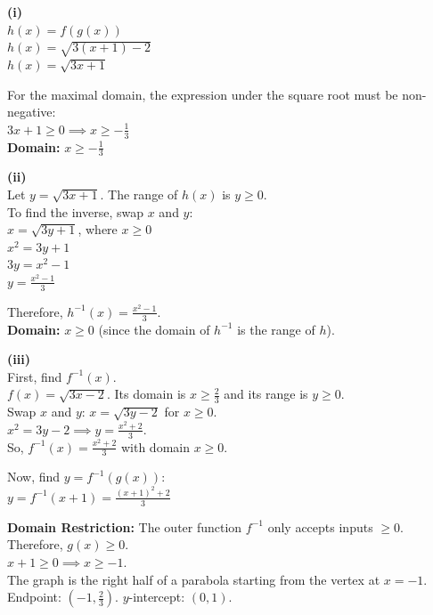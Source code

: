\begin{solution}
\textbf{(i)} \\
$h(x) = f(g(x))$ \\
$h(x) = \sqrt{3(x+1) - 2}$ \\
$h(x) = \sqrt{3x + 1}$

For the maximal domain, the expression under the square root must be non-negative: \\
$3x + 1 \ge 0 \implies x \ge -\frac{1}{3}$ \\
\textbf{Domain:} $x \ge -\frac{1}{3}$

\textbf{(ii)} \\
Let $y = \sqrt{3x + 1}$. The range of $h(x)$ is $y \ge 0$. \\
To find the inverse, swap $x$ and $y$: \\
$x = \sqrt{3y + 1}$, \quad where $x \ge 0$ \\
$x^2 = 3y + 1$ \\
$3y = x^2 - 1$ \\
$y = \frac{x^2 - 1}{3}$

Therefore, $h^{-1}(x) = \frac{x^2 - 1}{3}$. \\
\textbf{Domain:} $x \ge 0$ (since the domain of $h^{-1}$ is the range of $h$).

\textbf{(iii)} \\
First, find $f^{-1}(x)$. \\
$f(x) = \sqrt{3x-2}$. Its domain is $x \ge \frac{2}{3}$ and its range is $y \ge 0$. \\
Swap $x$ and $y$: $x = \sqrt{3y-2}$ for $x \ge 0$. \\
$x^2 = 3y - 2 \implies y = \frac{x^2 + 2}{3}$. \\
So, $f^{-1}(x) = \frac{x^2 + 2}{3}$ with domain $x \ge 0$.

Now, find $y = f^{-1}(g(x))$: \\
$y = f^{-1}(x+1) = \frac{(x+1)^2 + 2}{3}$

\textbf{Domain Restriction:} The outer function $f^{-1}$ only accepts inputs $\ge 0$. Therefore, $g(x) \ge 0$. \\
$x + 1 \ge 0 \implies x \ge -1$. \\
The graph is the right half of a parabola starting from the vertex at $x = -1$. \\
Endpoint: $(-1, \frac{2}{3})$. $y$-intercept: $(0, 1)$.

\vspace{0.5cm}
\begin{center}
\end{center}
\end{solution}
